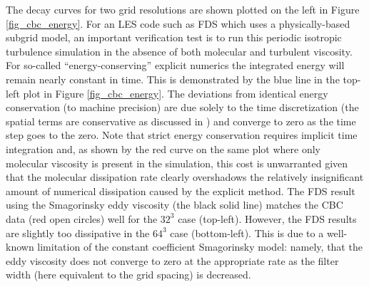 \documentclass[11pt]{book}
\begin{document}
The decay curves for two grid resolutions are shown plotted on the left in Figure \ref{fig_cbc_energy}.  For an LES code such as FDS which uses a physically-based subgrid model, an important verification test is to run this periodic isotropic turbulence simulation in the absence of both molecular and turbulent viscosity.  For so-called ``energy-conserving'' explicit numerics the integrated energy will remain nearly constant in time.  This is demonstrated by the blue line in the top-left plot in Figure \ref{fig_cbc_energy}.  The deviations from identical energy conservation (to machine precision) are due solely to the time discretization (the spatial terms are conservative as discussed in \cite{Morinishi}) and converge to zero as the time step goes to the zero.  Note that strict energy conservation requires implicit time integration \cite{Ham,McDermott:2007b} and, as shown by the red curve on the same plot where only molecular viscosity is present in the simulation, this cost is unwarranted given that the molecular dissipation rate clearly overshadows the relatively insignificant amount of numerical dissipation caused by the explicit method.  The FDS result using the Smagorinsky eddy viscosity (the black solid line) matches the CBC data (red open circles) well for the $32^3$ case (top-left).  However, the FDS results are slightly too dissipative in the $64^3$ case (bottom-left).  This is due to a well-known limitation of the constant coefficient Smagorinsky model: namely, that the eddy viscosity does not converge to zero at the appropriate rate as the filter width (here equivalent to the grid spacing) is decreased.
\end{document}
